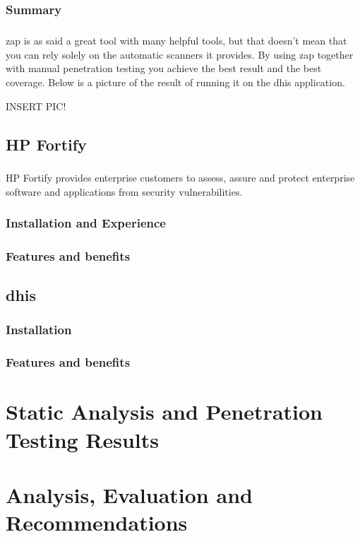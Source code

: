\documentclass[11pt,english,a4paper]{report}
\begin{document}
\subsection{Summary}
\paragraph{}
\gls{zap} is as said a great tool with many helpful tools, but that doesn't mean that you can rely solely on the automatic scanners it provides. 
By using \gls{zap} together with manual penetration testing you achieve the best result and the best coverage. 
Below is a picture of the result of running it on the \gls{dhis} application.

INSERT PIC!


\section{HP Fortify}
\paragraph{}
HP Fortify provides enterprise customers to assess, assure and protect enterprise software and applications from security vulnerabilities.


\subsection{Installation and Experience}
\paragraph{}


\subsection{Features and benefits}
\section{\gls{dhis}}
\subsection{Installation}
\subsection{Features and benefits}



\chapter{Static Analysis and Penetration Testing Results}
\chapter{Analysis, Evaluation and Recommendations}
\end{document}
